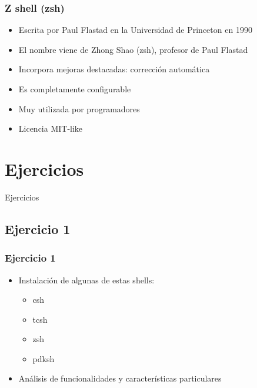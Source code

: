 \documentclass{beamer}
\begin{document}
\begin{frame}
  \frametitle{Z shell (zsh)}
  \begin{itemize}
    \item Escrita por Paul Flastad en la Universidad de Princeton en 1990
    \item El nombre viene de Zhong Shao (zsh), profesor de Paul Flastad
    \medskip
    \item Incorpora mejoras destacadas: corrección automática
    \item Es completamente configurable
    \medskip
    \item Muy utilizada por programadores
    \medskip
    \item Licencia MIT-like
  \end{itemize}
\end{frame}


\section{Ejercicios}
\begin{frame}
  \begin{center}
    \huge{Ejercicios}
  \end{center}
\end{frame}

\subsection{Ejercicio 1}

\begin{frame}
  \frametitle{Ejercicio 1}
  \begin{itemize}
    \item Instalación de algunas de estas shells:
    \begin{itemize}
      \item csh
      \item tcsh
      \item zsh
      \item pdksh
    \end{itemize}
    \item Análisis de funcionalidades y características particulares
  \end{itemize}
\end{frame}
\end{document}
